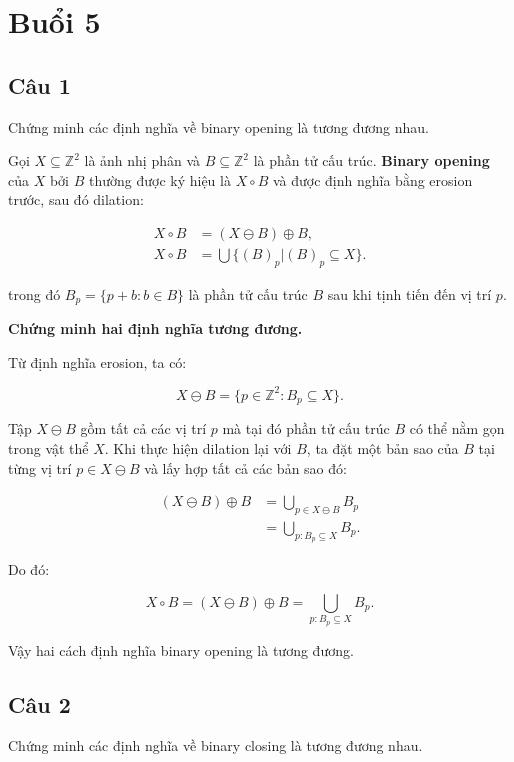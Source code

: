 \chapter{Buổi 5}
\label{Chapter5}
\setcounter{secnumdepth}{5}

\section*{Câu 1}
Chứng minh các định nghĩa về binary opening là tương đương nhau.

Gọi $X \subseteq \mathbb{Z}^2$ là ảnh nhị phân và $B \subseteq \mathbb{Z}^2$ là phần tử cấu trúc. \textbf{Binary opening} của $X$ bởi $B$ thường được ký hiệu là $X\circ B$ và được định nghĩa bằng erosion trước, sau đó dilation:

\begin{align}
    X \circ B &= (X \ominus B) \oplus B, \\
    X \circ B &= \bigcup \{ (B)_p | (B)_p \subseteq X \}.
\end{align}

trong đó $B_p=\{p+b:b\in B\}$ là phần tử cấu trúc $B$ sau khi tịnh tiến đến vị trí $p$.

\textbf{Chứng minh hai định nghĩa tương đương.}

Từ định nghĩa erosion, ta có:

\begin{equation}
    X\ominus B = \{p\in\mathbb{Z}^2 : B_p\subseteq X\}.
\end{equation}

Tập $X\ominus B$ gồm tất cả các vị trí $p$ mà tại đó phần tử cấu trúc $B$ có thể nằm gọn trong vật thể $X$. Khi thực hiện dilation lại với $B$, ta đặt một bản sao của $B$ tại từng vị trí $p\in X\ominus B$ và lấy hợp tất cả các bản sao đó:

\begin{align}
    (X\ominus B)\oplus B
    &= \bigcup_{p\in X\ominus B} B_p \\
    &= \bigcup_{p: B_p\subseteq X} B_p.
\end{align}

Do đó:

\begin{equation}
    X\circ B = (X\ominus B)\oplus B = \bigcup_{p: B_p\subseteq X} B_p.
\end{equation}

Vậy hai cách định nghĩa binary opening là tương đương.

\section*{Câu 2}
Chứng minh các định nghĩa về binary closing là tương đương nhau.

